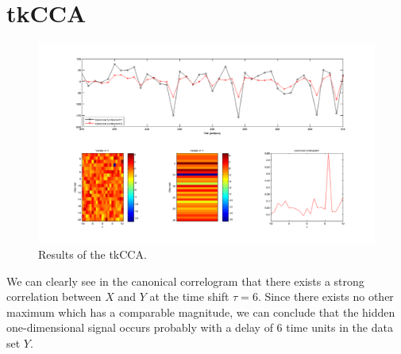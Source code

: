 \documentclass[a4paper, 12pt, titlepage]{article}
\begin{document}
\section{tkCCA}

\begin{figure}
	\includegraphics[width=17cm]{images/tkcca.png}
	\caption{Results of the tkCCA.}
\end{figure}

We can clearly see in the canonical correlogram that there exists a strong correlation between $X$ and $Y$ at the time shift $\tau=6$.
Since there exists no other maximum which has a comparable magnitude, we can conclude that the hidden one-dimensional signal occurs probably with a delay of $6$ time units in the data set $Y$.
\end{document}

